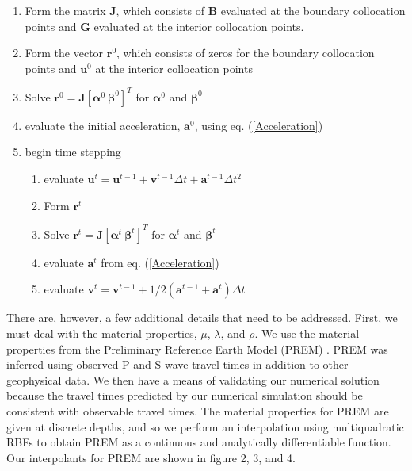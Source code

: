 \documentclass[12pt]{article}
\begin{document}
\begin{enumerate}
\item Form the matrix $\boldsymbol{J}$, which consists of
  $\boldsymbol{B}$ evaluated at the boundary collocation points and 
  $\boldsymbol{G}$ evaluated at the interior collocation points.
\item Form the vector $\boldsymbol{r}^0$, which consists of zeros for
  the boundary collocation points and $\boldsymbol{u}^{0}$ at the interior collocation points 
\item Solve $\boldsymbol{r}^0=\boldsymbol{J}[\boldsymbol{\alpha}^0\ \boldsymbol{\beta}^0]^T$ for
  $\boldsymbol{\alpha}^0$ and $\boldsymbol{\beta}^0$
\item evaluate the initial acceleration, $\boldsymbol{a}^0$, using eq. (\ref{Acceleration}) 
\item begin time stepping 
\begin{enumerate}
\item evaluate $\boldsymbol{u}^{t}=\boldsymbol{u}^{t-1} + 
                                  \boldsymbol{v}^{t-1}\Delta t + 
                                  \boldsymbol{a}^{t-1}\Delta t^2$
\item Form $\boldsymbol{r}^t$
\item Solve $\boldsymbol{r}^t=\boldsymbol{J}[\boldsymbol{\alpha}^t\ \boldsymbol{\beta}^t]^T$ for
  $\boldsymbol{\alpha}^t$ and $\boldsymbol{\beta}^t$
\item evaluate $\boldsymbol{a}^t$ from eq. (\ref{Acceleration})
\item evaluate $\boldsymbol{v}^t = \boldsymbol{v}^{t-1} +
  1/2(\boldsymbol{a}^{t-1} + \boldsymbol{a}^t)\Delta t$
\end{enumerate} 
\end{enumerate} 

There are, however, a few additional details that need to be
addressed.  First, we must deal with the material properties, $\mu$,
$\lambda$, and $\rho$.  We use the material properties from the
Preliminary Reference Earth Model (PREM) \citep{D1981}.  PREM was
inferred using observed P and S wave travel times in addition to other
geophysical data.  We then have a means of validating our numerical
solution because the travel times predicted by our numerical
simulation should be consistent with observable travel times.  The
material properties for PREM are given at discrete depths, and so we
perform an interpolation using multiquadratic RBFs to obtain PREM as a
continuous and analytically differentiable function.  Our interpolants
for PREM are shown in figure 2, 3, and 4.
\end{document}
